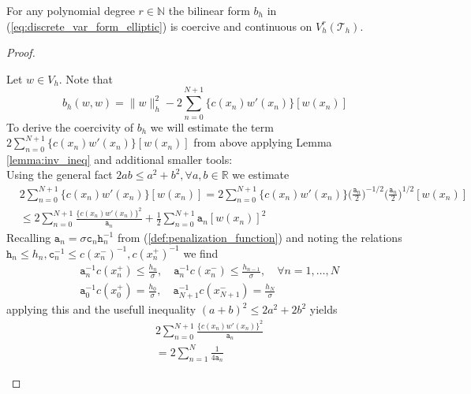 \begin{theorem}
    For any polynomial degree $r\in \mathbb{N}$ the bilinear form $b_h$ in (\ref{eq:discrete_var_form_elliptic})
    is coercive and continuous on $V_h^r(\mathcal{T}_h)$.
\end{theorem}
\begin{proof}
    \begin{proofstep}[Coercivity]
        Let $w\in V_h$. Note that 
        \begin{equation}
            \label{eq:coerc_thr_relation_bilin_form_with_norm}
            b_h(w,w) = \|w\|_h^2 - 2\sum_{n=0}^{N+1}\{c(x_n)w'(x_n)\}[w(x_n)] 
        \end{equation}
        To derive the coercivity of $b_h$ we will estimate the term $2\sum_{n=0}^{N+1}\{c(x_n)w'(x_n)\}[w(x_n)]$
        from above applying Lemma \ref{lemma:inv_ineq} and additional smaller tools:\\
        Using the general fact $2ab \leq a^2 + b^2, \forall a,b\in\mathbb{R}$ we estimate
        \begin{align}
            & 2\sum_{n=0}^{N+1}\{c(x_n)w'(x_n)\}[w(x_n)] = 2\sum_{n=0}^{N+1}\{c(x_n)w'(x_n)\}
            \Big(\frac{\texttt{a}_n}{2}\Big)^{-1/2} \Big(\frac{\texttt{a}_n}{2}\Big)^{1/2} [w(x_n)]\nonumber \\
            &\leq 2\sum_{n=0}^{N+1} \frac{\{c(x_n)w'(x_n)\}^2}{\texttt{a}_n} 
            + \frac{1}{2} \sum_{n=0}^{N+1} \texttt{a}_n [w(x_n)]^2 \label{eq:2_coerc_thr_first_estimate}
        \end{align}
        Recalling $\texttt{a}_n = \sigma \texttt{c}_n\texttt{h}_n^{-1}$ from (\ref{def:penalization_function}) and noting the relations
        $\texttt{h}_n \leq h_n, \texttt{c}_n^{-1} \leq c(x_n^-)^{-1}, c(x_n^+)^{-1}$ we find
        \begin{align*}
            & \texttt{a}_n^{-1} c(x_n^+) \leq \frac{h_n}{\sigma}, \quad \texttt{a}_n^{-1} c(x_n^-) \leq \frac{h_{n-1}}{\sigma}, \quad \forall n=1,\ldots,N \\
            & \texttt{a}_0^{-1} c(x_0^+) = \frac{h_0}{\sigma} , \quad \texttt{a}_{N+1}^{-1} c(x_{N+1}^-) = \frac{h_{N}}{\sigma}
        \end{align*}
        applying this and the usefull inequality $(a+b)^2 \leq 2a^2 + 2b^2$ yields
        \begin{align}
            \label{eq:coerc_thr_second_estimate}
            &2\sum_{n=0}^{N+1} \frac{\{c(x_n)w'(x_n)\}^2}{\texttt{a}_n} \nonumber \\ 
            &= 2\sum_{n=1}^{N} \frac{1}{4\texttt{a}_n}

\end{align}
\end{proofstep}
\end{proof}
